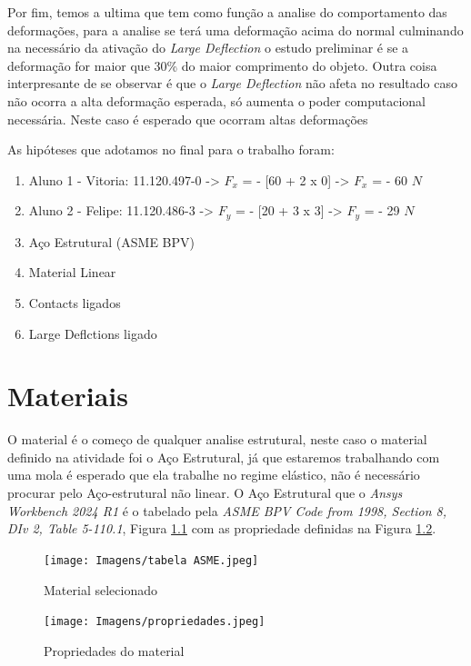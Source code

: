 \documentclass[acronym,symbols]{fei}
\begin{document}
Por fim, temos a ultima que tem como função a analise do comportamento das deformações, para a analise se terá uma deformação acima do normal culminando na necessário da ativação do \textit{Large Deflection} o estudo preliminar é se a deformação for maior que 30\% do maior comprimento do objeto. Outra coisa interpresante de se observar é que o \textit{Large Deflection} não afeta no resultado caso não ocorra a alta deformação esperada, só aumenta o poder computacional necessária. Neste caso é esperado que ocorram altas deformações

As hipóteses que adotamos no final para o trabalho foram:
\begin{enumerate}
    \item Aluno 1 - Vitoria: 11.120.497-0 -> $F_x$ = - [60 + 2 x 0] -> $F_x$ = - 60 $N$
    \item Aluno 2 - Felipe: 11.120.486-3 -> $F_y$ = - [20 + 3 x 3] -> $F_y$ = - 29 $N$
    \item Aço Estrutural (ASME BPV)
    \item Material Linear
    \item Contacts ligados
    \item Large Deflctions ligado
\end{enumerate}

\chapter{Materiais}

O material é o começo de qualquer analise estrutural, neste caso o material definido na atividade foi o Aço Estrutural, já que estaremos trabalhando com uma mola é esperado que ela trabalhe no regime elástico, não é necessário procurar pelo Aço-estrutural não linear. O Aço Estrutural que o \textit{Ansys Workbench 2024 R1} é o tabelado pela \textit{ASME BPV Code from 1998, Section 8, DIv 2, Table 5-110.1}, Figura \ref{fig: tabela} com as propriedade definidas na Figura \ref{fig: propriedades}.

\begin{figure}[!htb]
    \centering
    \caption{Material selecionado}
    \texttt{[image: Imagens/tabela ASME.jpeg]}
    \label{fig: tabela}
\end{figure}

\begin{figure}[!htb]
    \centering
    \caption{Propriedades do material}
    \texttt{[image: Imagens/propriedades.jpeg]}
    \label{fig: propriedades}
\end{figure}
\end{document}
